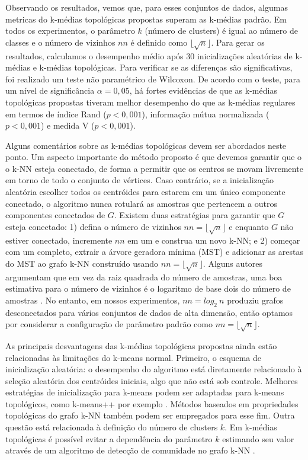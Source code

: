 \documentclass[sn-mathphys,Numbered]{sn-jnl}%
\theoremstyle{thmstyleone}%
\theoremstyle{thmstyletwo}%
\theoremstyle{thmstylethree}%
\begin{document}
Observando os resultados, vemos que, para esses conjuntos de dados, algumas metricas do k-médias topológicas propostas superam as k-médias padrão. Em todos os experimentos, o parâmetro $k$ (número de clusters) é igual ao número de classes e o número de vizinhos $nn$ é definido como $\lfloor \sqrt{n} \rfloor$. Para gerar os resultados, calculamos o desempenho médio após 30 inicializações aleatórias de k-médias e k-médias topológicas. Para verificar se as diferenças são significativas, foi realizado um teste não paramétrico de Wilcoxon. De acordo com o teste, para um nível de significância $\alpha = 0,05$, há fortes evidências de que as k-médias topológicas propostas tiveram melhor desempenho do que as k-médias regulares em termos de índice Rand ($p < 0,001$), informação mútua normalizada ( $p < 0,001$) e medida V ($p < 0,001$).

Alguns comentários sobre as k-médias topológicas devem ser abordados neste ponto. Um aspecto importante do método proposto é que devemos garantir que o o k-NN esteja conectado, de forma a permitir que os centros se movam livremente em torno de todo o conjunto de vértices. Caso contrário, se a inicialização aleatória escolher todos os centróides para estarem em um único componente conectado, o algoritmo nunca rotulará as amostras que pertencem a outros componentes conectados de $G$. Existem duas estratégias para garantir que $G$ esteja conectado: 1) defina o número de vizinhos $nn = \lfloor \sqrt{n} \rfloor$ e enquanto $G$ não estiver conectado, incremente $nn$ em um e construa um novo  k-NN; e 2) começar com um  completo, extrair a árvore geradora mínima (MST) e adicionar as arestas do MST ao grafo k-NN construído usando $nn = \lfloor \sqrt{n} \rfloor$. Alguns autores argumentam que em vez da raiz quadrada do número de amostras, uma boa estimativa para o número de vizinhos é o logaritmo de base dois do número de amostras \cite{RandomGraphs,LOG}. No entanto, em nossos experimentos, $nn = log_2~n$ produziu grafos desconectados para vários conjuntos de dados de alta dimensão, então optamos por considerar a configuração de parâmetro padrão como $nn = \lfloor \sqrt{n} \rfloor$.

As principais desvantagens das k-médias topológicas propostas ainda estão relacionadas às limitações do k-means normal. Primeiro, o esquema de inicialização aleatória: o desempenho do algoritmo está diretamente relacionado à seleção aleatória dos centróides iniciais, algo que não está sob controle. Melhores estratégias de inicialização para k-means podem ser adaptadas para k-means topológicos, como k-means++ por exemplo \cite{kmeans++}. Métodos baseados em propriedades topológicas do grafo k-NN também podem ser empregados para esse fim. Outra questão está relacionada à definição do número de clusters $k$. Em k-médias topológicas é possível evitar a dependência do parâmetro $k$ estimando seu valor através de um algoritmo de detecção de comunidade no grafo k-NN \cite{Community}.
\end{document}
